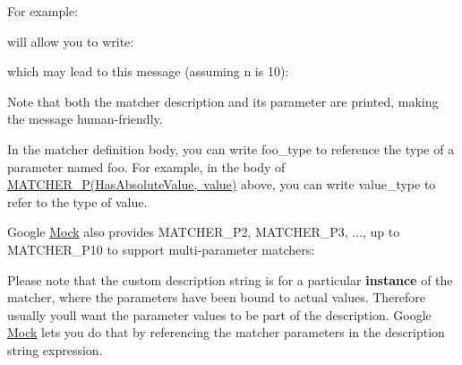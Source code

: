 For example\+: 
\begin{DoxyCode}{0}
\end{DoxyCode}
 will allow you to write\+: 
\begin{DoxyCode}{0}
\end{DoxyCode}
 which may lead to this message (assuming {\ttfamily n} is 10)\+: 
\begin{DoxyCode}{0}
\end{DoxyCode}


Note that both the matcher description and its parameter are printed, making the message human-\/friendly.

In the matcher definition body, you can write {\ttfamily foo\+\_\+type} to reference the type of a parameter named {\ttfamily foo}. For example, in the body of {\ttfamily \mbox{\hyperlink{_obj__test_2lib_2googletest-release-1_88_81_2googlemock_2include_2gmock_2gmock-generated-matchers_8h_acb7ae915efa2fd8d3f6ea7313198afb6}{M\+A\+T\+C\+H\+E\+R\+\_\+\+P(\+Has\+Absolute\+Value, value)}}} above, you can write {\ttfamily value\+\_\+type} to refer to the type of {\ttfamily value}.

Google \mbox{\hyperlink{class_mock}{Mock}} also provides {\ttfamily M\+A\+T\+C\+H\+E\+R\+\_\+\+P2}, {\ttfamily M\+A\+T\+C\+H\+E\+R\+\_\+\+P3}, ..., up to {\ttfamily M\+A\+T\+C\+H\+E\+R\+\_\+\+P10} to support multi-\/parameter matchers\+: 
\begin{DoxyCode}{0}
\end{DoxyCode}


Please note that the custom description string is for a particular {\bfseries{instance}} of the matcher, where the parameters have been bound to actual values. Therefore usually you\textquotesingle{}ll want the parameter values to be part of the description. Google \mbox{\hyperlink{class_mock}{Mock}} lets you do that by referencing the matcher parameters in the description string expression.

